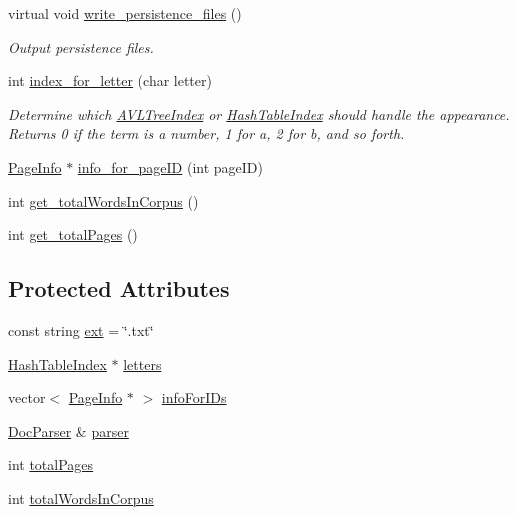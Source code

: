\begin{DoxyCompactItemize}
virtual void \hyperlink{class_index_interface_a0b4ec5fcc32c08959cffad3a3141dd4e}{write\+\_\+persistence\+\_\+files} ()
\begin{DoxyCompactList}\small\item\em Output persistence files. \end{DoxyCompactList}\item 
int \hyperlink{class_index_interface_a9a7539d9c7a48bf4d4fbe43961c0547f}{index\+\_\+for\+\_\+letter} (char letter)
\begin{DoxyCompactList}\small\item\em Determine which \hyperlink{class_a_v_l_tree_index}{A\+V\+L\+Tree\+Index} or \hyperlink{class_hash_table_index}{Hash\+Table\+Index} should handle the appearance. Returns 0 if the term is a number, 1 for \textquotesingle{}a\textquotesingle{}, 2 for \textquotesingle{}b\textquotesingle{}, and so forth. \end{DoxyCompactList}\item 
\hyperlink{class_page_info}{Page\+Info} $\ast$ \hyperlink{class_index_interface_a2af7d88c3b2701be9164ba9f4a3bddb3}{info\+\_\+for\+\_\+page\+I\+D} (int page\+I\+D)
\item 
int \hyperlink{class_index_interface_a8a0132ad6e84c4340061496c615f581c}{get\+\_\+total\+Words\+In\+Corpus} ()
\item 
int \hyperlink{class_index_interface_af9edc24ac00bdf2c0e06384f890a1d8a}{get\+\_\+total\+Pages} ()
\end{DoxyCompactItemize}
\subsection*{Protected Attributes}
\begin{DoxyCompactItemize}
\item 
const string \hyperlink{class_index_interface_acd76893126e9fd5dc63cb4ea8f56265c}{ext} = \char`\"{}.txt\char`\"{}
\item 
\hyperlink{class_hash_table_index}{Hash\+Table\+Index} $\ast$ \hyperlink{class_index_interface_a8511509bb58da989f705ba75fd5dde2d}{letters}
\item 
vector$<$ \hyperlink{class_page_info}{Page\+Info} $\ast$ $>$ \hyperlink{class_index_interface_a8400a62750faa69ff35308ff731d9ee5}{info\+For\+I\+Ds}
\item 
\hyperlink{class_doc_parser}{Doc\+Parser} \& \hyperlink{class_index_interface_a42b0d9eccd309185ed92976f72908bb9}{parser}
\item 
int \hyperlink{class_index_interface_a2df695d2b504f2e53a0bfdd6bfee31da}{total\+Pages}
\item 
int \hyperlink{class_index_interface_ab607b430e78528cdb8bb79ba4afa91d2}{total\+Words\+In\+Corpus}
\end{DoxyCompactItemize}


